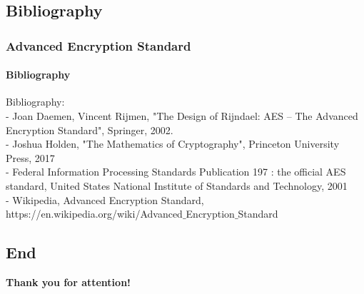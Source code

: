 \subsection{Bibliography}
\begin{frame}
	\frametitle{Advanced Encryption Standard}
		\framesubtitle{Bibliography}
	{\normalsize 
	
	Bibliography:\\	
	\vspace{0,2cm}
{- Joan Daemen, Vincent Rijmen, "The Design of Rijndael: AES – The Advanced Encryption Standard", Springer, 2002.}\\
\vspace{0,2cm}
{- Joshua Holden, "The Mathematics of Cryptography", Princeton University Press, 2017}\\
\vspace{0,2cm}
{- Federal Information Processing Standards Publication 197 : the official AES standard, United States National Institute of Standards and Technology, 2001}\\
\vspace{0,2cm}
{- Wikipedia, Advanced Encryption Standard, https://en.wikipedia.org/wiki/Advanced$\_$Encryption$\_$Standard}\\

	}
\end{frame}

\subsection{End}
\begin{frame}
	
	\begin{center}
		\Huge \textbf{Thank you for attention!}
	\end{center}

\end{frame}
